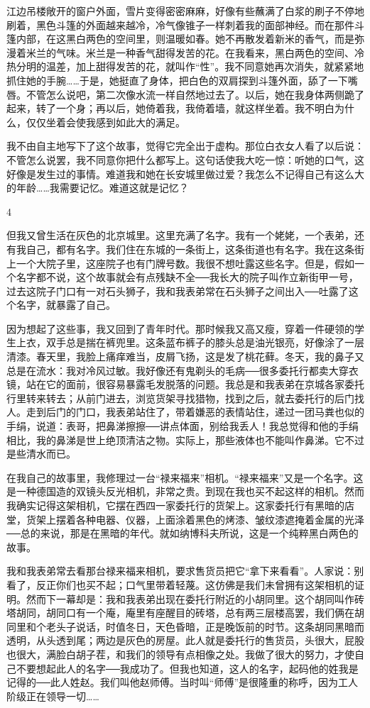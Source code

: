 江边吊楼敞开的窗户外面，雪片变得密密麻麻，好像有些蘸满了白浆的刷子不停地刷着，黑色斗篷的外面越来越冷，冷气像锥子一样刺着我的面部神经。而在那件斗篷内部，在这黑白两色的空间里，则温暖如春。她不再散发着新米的香气，而是弥漫着米兰的气味。米兰是一种香气甜得发苦的花。在我看来，黑白两色的空间、冷热分明的温差，加上甜得发苦的花，就叫作“性”。我不同意她再次消失，就紧紧地抓住她的手腕……于是，她挺直了身体，把白色的双肩探到斗篷外面，舔了一下嘴唇。不管怎么说吧，第二次像水流一样自然地过去了。以后，她在我身体两侧跪了起来，转了一个身；再以后，她倚着我，我倚着墙，就这样坐着。我不明白为什么，仅仅坐着会使我感到如此大的满足。 

我不由自主地写下了这个故事，觉得它完全出于虚构。那位白衣女人看了以后说：不管怎么说罢，我不同意你把什么都写上。这句话使我大吃一惊：听她的口气，这好像是发生过的事情。难道我和她在长安城里做过爱？我怎么不记得自己有这么大的年龄……我需要记忆。难道这就是记忆？ 

4 

但我又曾生活在灰色的北京城里。这里充满了名字。我有一个姥姥，一个表弟，还有我自己，都有名字。我们住在东城的一条街上，这条街道也有名字。我在这条街上一个大院子里，这座院子也有门牌号数。我很不想吐露这些名字。但是，假如一个名字都不说，这个故事就会有点残缺不全──我长大的院子叫作立新街甲一号，过去这院子门口有一对石头狮子，我和我表弟常在石头狮子之间出入──吐露了这个名字，就暴露了自己。 

因为想起了这些事，我又回到了青年时代。那时候我又高又瘦，穿着一件硬领的学生上衣，双手总是揣在裤兜里。这条蓝布裤子的膝头总是油光银亮，好像涂了一层清漆。春天里，我脸上痛痒难当，皮屑飞扬，这是发了桃花藓。冬天，我的鼻子又总是在流水：我对冷风过敏。我好像还有鬼剃头的毛病──很多委托行都卖大穿衣镜，站在它的面前，很容易暴露毛发脱落的问题。我总是和我表弟在京城各家委托行里转来转去；从前门进去，浏览货架寻找猎物，找到之后，就去委托行的后门找人。走到后门的门口，我表弟站住了，带着嫌恶的表情站住，递过一团马粪也似的手绢，说道：表哥，把鼻涕擦擦──讲点体面，别给我丢人！我总觉得和他的手绢相比，我的鼻涕是世上绝顶清洁之物。实际上，那些液体也不能叫作鼻涕。它不过是些清水而已。 

在我自己的故事里，我修理过一台“禄来福来”相机。“禄来福来”又是一个名字。这是一种德国造的双镜头反光相机，非常之贵。到现在我也买不起这样的相机。然而我确实记得这架相机，它摆在西四一家委托行的货架上。这家委托行有黑暗的店堂，货架上摆着各种电器、仪器，上面涂着黑色的烤漆、皱纹漆遮掩着金属的光泽──总的来说，那是在黑暗的年代。就如纳博科夫所说，这是一个纯粹黑白两色的故事。 

我和我表弟常去看那台禄来福来相机，要求售货员把它“拿下来看看”。人家说：别看了，反正你们也买不起；口气里带着轻蔑。这仿佛是我们未曾拥有这架相机的证明。然而下一幕却是：我和我表弟出现在委托行附近的小胡同里。这个胡同叫作砖塔胡同，胡同口有一个庵，庵里有座醒目的砖塔，总有两三层楼高罢，我们俩在胡同里和个老头子说话，时值冬日，天色昏暗，正是晚饭前的时节。这条胡同黑暗而透明，从头透到尾；两边是灰色的房屋。此人就是委托行的售货员，头很大，屁股也很大，满脸白胡子茬，和我们的领导有点相像之处。我做了很大的努力，才使自己不要想起此人的名字──我成功了。但我也知道，这人的名字，起码他的姓我是记得的──此人姓赵。我们叫他赵师傅。当时叫“师傅”是很隆重的称呼，因为工人阶级正在领导一切…… 

